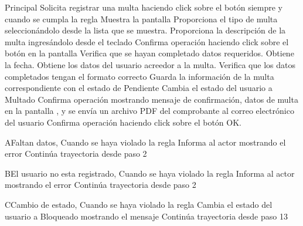 	\begin{UCtrayectoria}{Principal}
		\UCpaso[\UCactor] Solicita registrar una multa haciendo click sobre el botón  siempre y cuando se cumpla la regla 
		\UCpaso Muestra la pantalla 
		\UCpaso[\UCactor] Proporciona el tipo de multa seleccionándolo desde la lista que se muestra.
		\UCpaso[\UCactor] Proporciona la descripción de la multa ingres\'andolo desde el teclado
		\UCpaso[\UCactor] Confirma operación haciendo click sobre el botón  en la pantalla
		\UCpaso Verifica que se hayan completado datos requeridos.
		\UCpaso Obtiene la fecha.
		\UCpaso Obtiene los datos del usuario acreedor a la multa.
		\UCpaso Verifica que los datos completados tengan el formato correcto 
		\UCpaso Guarda la información de la multa correspondiente con el estado de Pendiente	
		\UCpaso Cambia el estado del usuario a Multado 
		\UCpaso Confirma operación mostrando mensaje de confirmación, datos de multa  en la pantalla , y se envía un archivo PDF del comprobante  al correo electrónico del usuario 
		\UCpaso[\UCactor] Confirma operación haciendo click sobre el botón OK.	
\end{UCtrayectoria}

		\begin{UCtrayectoriaA}{A}{Faltan datos,
Cuando se haya violado la regla }
	\UCpaso Informa al actor mostrando el error  
	\UCpaso Continúa trayectoria desde paso 2 
\end{UCtrayectoriaA}

\begin{UCtrayectoriaA}{B}{El usuario no esta registrado,
Cuando se haya violado la regla }
	\UCpaso Informa al actor mostrando el error 
	\UCpaso Continúa trayectoria desde paso 2 
\end{UCtrayectoriaA}

\begin{UCtrayectoriaA}{C}{Cambio de estado,
Cuando se haya violado la regla }
	\UCpaso Cambia el estado del usuario a Bloqueado mostrando el mensaje  
	\UCpaso Continúa trayectoria desde paso 13 
\end{UCtrayectoriaA}

